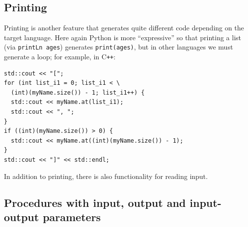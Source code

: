 \documentclass[sigplan,review,prologue,dvipsnames]{acmart}
\newcommand{\Cplusplus}{C\texttt{++}}
\begin{document}
\subsection{Printing}

Printing is another feature that generates quite
different code depending on the target language.  Here again Python
is more ``expressive'' so that printing a list (via
\verb|printLn ages|) generates \verb|print(ages)|, but in other languages
we must generate a loop; for example, in \Cplusplus:
\begin{lstlisting}
std::cout << "[";
for (int list_i1 = 0; list_i1 < \
  (int)(myName.size()) - 1; list_i1++) {
  std::cout << myName.at(list_i1);
  std::cout << ", ";
}
if ((int)(myName.size()) > 0) {
  std::cout << myName.at((int)(myName.size()) - 1);
}
std::cout << "]" << std::endl;
\end{lstlisting}
In addition to printing, there is also functionality for reading input.

\subsection{Procedures with input, output and input-output parameters}
\end{document}
